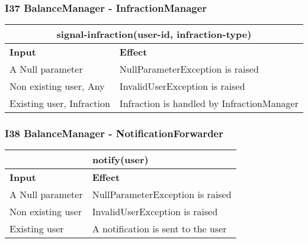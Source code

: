 \subsubsection{I37 BalanceManager - InfractionManager}
\begin{tabular}{|p{5cm}|p{7cm}|}
\hline
\multicolumn{2}{|c|}{signal-infraction(user-id, infraction-type)} \\
\hline
\textbf{Input} & \textbf{Effect} \\

\hline
A Null parameter & NullParameterException is raised \\

\hline
Non existing user, Any & InvalidUserException is raised \\

\hline
Existing user, Infraction & Infraction is handled by InfractionManager \\
\hline
\end{tabular}

\subsubsection{I38 BalanceManager - NotificationForwarder}
\begin{tabular}{|p{5cm}|p{7cm}|}
\hline
\multicolumn{2}{|c|}{notify(user)} \\
\hline
\textbf{Input} & \textbf{Effect} \\

\hline
A Null parameter & NullParameterException is raised \\

\hline
Non existing user & InvalidUserException is raised \\

\hline
Existing user & A notification is sent to the user \\
\hline
\end{tabular}

